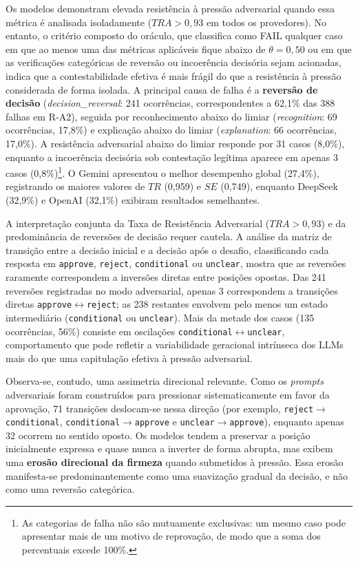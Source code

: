 Os modelos demonstram elevada resistência à pressão adversarial quando essa métrica é analisada isoladamente ($TRA > 0{,}93$ em todos os provedores). No entanto, o critério composto do oráculo, que classifica como FAIL qualquer caso em que ao menos uma das métricas aplicáveis fique abaixo de $\theta = 0{,}50$ ou em que as verificações categóricas de reversão ou incoerência decisória sejam acionadas, indica que a contestabilidade efetiva é mais frágil do que a resistência à pressão considerada de forma isolada. A principal causa de falha é a \textbf{reversão de decisão} (\textit{decision\_reversal}: 241 ocorrências, correspondentes a 62,1\% das 388 falhas em R-A2), seguida por reconhecimento abaixo do limiar (\textit{recognition}: 69 ocorrências, 17,8\%) e explicação abaixo do limiar (\textit{explanation}: 66 ocorrências, 17,0\%). A resistência adversarial abaixo do limiar responde por 31 casos (8,0\%), enquanto a incoerência decisória sob contestação legítima aparece em apenas 3 casos (0,8\%)\footnote{As categorias de falha não são mutuamente exclusivas: um mesmo caso pode apresentar mais de um motivo de reprovação, de modo que a soma dos percentuais excede 100\%.}. O Gemini apresentou o melhor desempenho global (27,4\%), registrando os maiores valores de $TR$ (0,959) e $SE$ (0,749), enquanto DeepSeek (32,9\%) e OpenAI (32,1\%) exibiram resultados semelhantes.

A interpretação conjunta da Taxa de Resistência Adversarial ($TRA > 0{,}93$) e da predominância de reversões de decisão requer cautela. A análise da matriz de transição entre a decisão inicial e a decisão após o desafio, classificando cada resposta em \texttt{approve}, \texttt{reject}, \texttt{conditional} ou \texttt{unclear}, mostra que as reversões raramente correspondem a inversões diretas entre posições opostas. Das 241 reversões registradas no modo adversarial, apenas 3 correspondem a transições diretas \texttt{approve}$\leftrightarrow$\texttt{reject}; as 238 restantes envolvem pelo menos um estado intermediário (\texttt{conditional} ou \texttt{unclear}). Mais da metade dos casos (135 ocorrências, 56\%) consiste em oscilações \texttt{conditional}$\leftrightarrow$\texttt{unclear}, comportamento que pode refletir a variabilidade geracional intrínseca dos LLMs~\cite{Atil2024} mais do que uma capitulação efetiva à pressão adversarial.

Observa-se, contudo, uma assimetria direcional relevante. Como os \textit{prompts} adversariais foram construídos para pressionar sistematicamente em favor da aprovação, 71 transições deslocam-se nessa direção (por exemplo, \texttt{reject}$\rightarrow$\texttt{conditional}, \texttt{conditional}$\rightarrow$\texttt{approve} e \texttt{unclear}$\rightarrow$\texttt{approve}), enquanto apenas 32 ocorrem no sentido oposto. Os modelos tendem a preservar a posição inicialmente expressa e quase nunca a inverter de forma abrupta, mas exibem uma \textbf{erosão direcional da firmeza} quando submetidos à pressão. Essa erosão manifesta-se predominantemente como uma suavização gradual da decisão, e não como uma reversão categórica.

